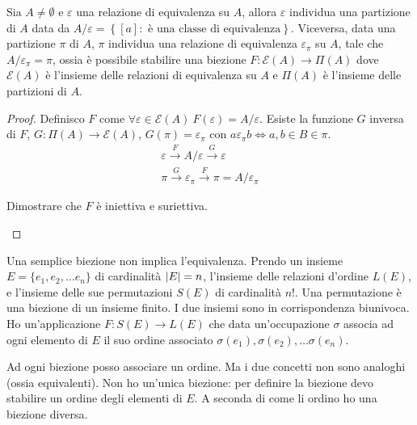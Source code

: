 \begin{prop}
Sia $A \neq \emptyset$ e $\varepsilon$ una relazione di equivalenza su $A$, allora $\varepsilon$ individua una partizione di $A$ data da $A / \varepsilon = \left \{ [a] :  \text{ \`e una classe di equivalenza}  \right \}$. Viceversa, data una partizione $\pi$ di $A$, $\pi$ individua una relazione di equivalenza $\varepsilon_{\pi}$ su $A$, tale che $A / \varepsilon_{\pi} = \pi$, ossia \`e possibile stabilire una biezione $F: \mathcal{E}(A) \to \Pi(A)$ dove $\mathcal{E}(A)$ \`e l'insieme delle relazioni di equivalenza su $A$ e $\Pi(A)$ \`e l'insieme delle partizioni di $A$.
\end{prop}
\begin{proof}
Definisco $F$ come $\forall \varepsilon \in \mathcal{E}(A) \ F(\varepsilon) = A / \varepsilon$. Esiste la funzione $G$ inversa di $F$, $G : \Pi(A) \to \mathcal{E}(A)$, $G(\pi) = \varepsilon_{\pi}$ con $a \varepsilon_{\pi} b \iff a,b \in B \in \pi$.
\begin{gather*}
\varepsilon \xrightarrow{F} A / \varepsilon \xrightarrow{G} \varepsilon \\
\pi \xrightarrow{G} \varepsilon_{\pi} \xrightarrow{F} \pi = A / \varepsilon_{\pi} 
\end{gather*}

\begin{esercizio}
Dimostrare che $F$ \`e iniettiva e suriettiva.

\vspace{5cm}
\end{esercizio}

\end{proof}

Una semplice biezione non implica l'equivalenza. Prendo un insieme $E = \{e_1, e_2, \dots e_n\}$ di cardinalit\`a $\left\lvert{E}\right\rvert = n$, l'insieme delle relazioni d'ordine $L(E)$, e l'insieme delle sue permutazioni $S(E)$ di cardinalit\`a $n!$. Una permutazione \`e una biezione di un insieme finito. I due insiemi sono in corrispondenza biunivoca. Ho un'applicazione $F : S(E) \to L(E)$ che data un'occupazione $\sigma$ associa ad ogni elemento di $E$ il suo ordine associato $\sigma(e_1), \sigma(e_2), \dots \sigma(e_n)$. 

Ad ogni biezione posso associare un ordine. Ma i due concetti non sono analoghi (ossia equivalenti). Non ho un'unica biezione: per definire la biezione devo stabilire un ordine degli elementi di $E$. A seconda di come li ordino ho una biezione diversa.

